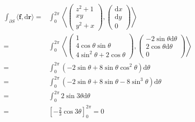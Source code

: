 \documentclass[12pt,b5paper]{ltjsarticle}
\begin{document}
\begin{enumerate}
      \begin{align}
       \int_{\partial S} \langle \bm{f},\mathrm{d}\bm{r}\rangle
       =&
       \int_{0}^{2\pi} \left\langle
        \begin{pmatrix}
         z^2+1 \\ xy \\ y^2+x
        \end{pmatrix}
       ,
       \begin{pmatrix}
         \mathrm{d}x\\\mathrm{d}y\\0
       \end{pmatrix}
       \right\rangle\\
       =&
       \int_{0}^{2\pi} \left\langle
        \begin{pmatrix}
         1 \\ 4\cos\theta\sin\theta \\ 4\sin^2\theta+2\cos\theta
        \end{pmatrix}
       ,
       \begin{pmatrix}
         -2\sin\theta\mathrm{d}\theta\\2\cos\theta\mathrm{d}\theta\\0
       \end{pmatrix}
       \right\rangle\\
       =& \int_{0}^{2\pi} \left( -2\sin\theta + 8\sin\theta\cos^2\theta \right)\mathrm{d}\theta\\
       =& \int_{0}^{2\pi} \left( -2\sin\theta + 8\sin\theta - 8\sin^3\theta \right)\mathrm{d}\theta\\
       =& \int_{0}^{2\pi} 2\sin3\theta \mathrm{d}\theta\\
       =& \left[ -\frac{2}{3}\cos3\theta \right]_{0}^{2\pi} =0
      \end{align}




\hrulefill

\end{enumerate}

\hrulefill
\end{document}
